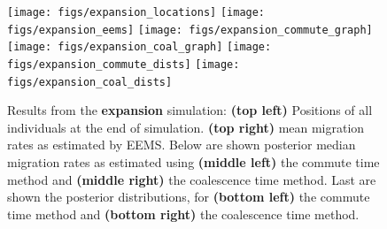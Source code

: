 \documentclass{article}
\begin{document}
\begin{figure}
\centering
    \texttt{[image: figs/expansion\_locations]}
    \texttt{[image: figs/expansion\_eems]}
    \texttt{[image: figs/expansion\_commute\_graph]}
    \texttt{[image: figs/expansion\_coal\_graph]}
    \texttt{[image: figs/expansion\_commute\_dists]}
    \texttt{[image: figs/expansion\_coal\_dists]}
    \caption{
        Results from the \textbf{expansion} simulation:
        \textbf{(top left)} Positions of all individuals at the end of simulation.
        \textbf{(top right)} mean migration rates as estimated by EEMS.
        Below are shown
        posterior median migration rates 
            as estimated using 
            \textbf{(middle left)} the commute time method and
            \textbf{(middle right)} the coalescence time method.
        Last are shown the posterior distributions, for
            \textbf{(bottom left)} the commute time method and
            \textbf{(bottom right)} the coalescence time method.
        \label{sfig:expansion_results}
    }
\end{figure}
\end{document}
